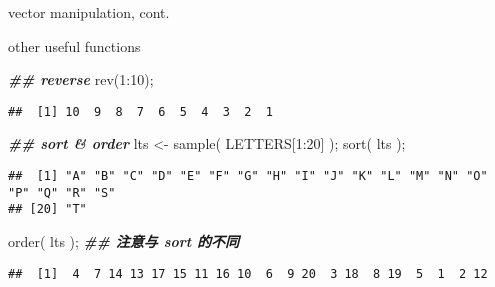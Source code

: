 \documentclass[ignorenonframetext,]{beamer}
\newenvironment{Shaded}{\begin{snugshade}}{\end{snugshade}}
\newcommand{\DecValTok}[1]{\textcolor[rgb]{0.00,0.00,0.81}{#1}}
\newcommand{\DocumentationTok}[1]{\textcolor[rgb]{0.56,0.35,0.01}{\textbf{\textit{#1}}}}
\newcommand{\FunctionTok}[1]{\textcolor[rgb]{0.00,0.00,0.00}{#1}}
\newcommand{\NormalTok}[1]{#1}
\newcommand{\OtherTok}[1]{\textcolor[rgb]{0.56,0.35,0.01}{#1}}
\newcommand{\SpecialCharTok}[1]{\textcolor[rgb]{0.00,0.00,0.00}{#1}}
\newcommand\FontSmall{\fontsize{7}{8}\selectfont}
\begin{document}
\begin{frame}[fragile]{vector manipulation, cont.}
\protect\hypertarget{vector-manipulation-cont.-3}{}
\begin{block}{other useful functions}
\protect\hypertarget{other-useful-functions}{}
\FontSmall

\begin{Shaded}
\begin{Highlighting}[]
\DocumentationTok{\#\# reverse}
\FunctionTok{rev}\NormalTok{(}\DecValTok{1}\SpecialCharTok{:}\DecValTok{10}\NormalTok{);}
\end{Highlighting}
\end{Shaded}

\begin{verbatim}
##  [1] 10  9  8  7  6  5  4  3  2  1
\end{verbatim}

\begin{Shaded}
\begin{Highlighting}[]
\DocumentationTok{\#\# sort  \& order }
\NormalTok{lts }\OtherTok{\textless{}{-}} \FunctionTok{sample}\NormalTok{( LETTERS[}\DecValTok{1}\SpecialCharTok{:}\DecValTok{20}\NormalTok{] );}
\FunctionTok{sort}\NormalTok{( lts );}
\end{Highlighting}
\end{Shaded}

\begin{verbatim}
##  [1] "A" "B" "C" "D" "E" "F" "G" "H" "I" "J" "K" "L" "M" "N" "O" "P" "Q" "R" "S"
## [20] "T"
\end{verbatim}

\begin{Shaded}
\begin{Highlighting}[]
\FunctionTok{order}\NormalTok{( lts  ); }\DocumentationTok{\#\# 注意与 sort 的不同}
\end{Highlighting}
\end{Shaded}

\begin{verbatim}
##  [1]  4  7 14 13 17 15 11 16 10  6  9 20  3 18  8 19  5  1  2 12
\end{verbatim}
\end{block}
\end{frame}
\end{document}
